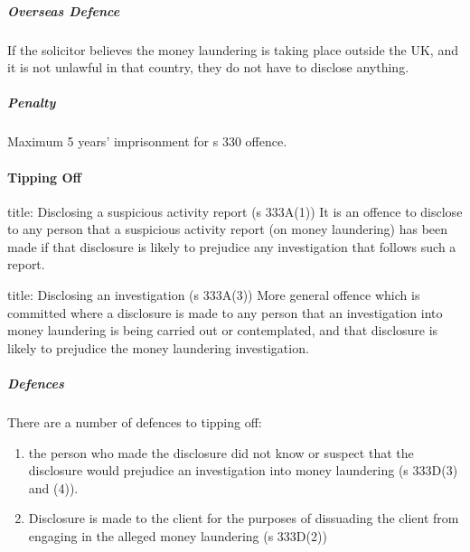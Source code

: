 \documentclass[
]{article}
\newenvironment{Shaded}{}{}
\newcommand{\NormalTok}[1]{#1}
\providecommand{\tightlist}{%
  \setlength{\itemsep}{0pt}\setlength{\parskip}{0pt}}
\begin{document}
\hypertarget{overseas-defence}{%
\subparagraph{Overseas Defence}\label{overseas-defence}}

If the solicitor believes the money laundering is taking place outside
the UK, and it is not unlawful in that country, they do not have to
disclose anything.

\hypertarget{penalty}{%
\subparagraph{Penalty}\label{penalty}}

Maximum 5 years' imprisonment for s 330 offence.

\hypertarget{tipping-off}{%
\paragraph{Tipping Off}\label{tipping-off}}

\begin{Shaded}
\begin{Highlighting}[]
\NormalTok{title: Disclosing a suspicious activity report (s 333A(1))}
\NormalTok{It is an offence to disclose to any person that a suspicious activity report (on money laundering) has been made if that disclosure is likely to prejudice any investigation that follows such a report. }
\end{Highlighting}
\end{Shaded}

\begin{Shaded}
\begin{Highlighting}[]
\NormalTok{title: Disclosing an investigation (s 333A(3))}
\NormalTok{More general offence which is committed where a disclosure is made to any person that an investigation into money laundering is being carried out or contemplated, and that disclosure is likely to prejudice the money laundering investigation.}
\end{Highlighting}
\end{Shaded}

\hypertarget{defences}{%
\subparagraph{Defences}\label{defences}}

There are a number of defences to tipping off:

\begin{enumerate}
\def\labelenumi{\arabic{enumi}.}
\tightlist
\item
  the person who made the disclosure did not know or suspect that the
  disclosure would prejudice an investigation into money laundering (s
  333D(3) and (4)).
\item
  Disclosure is made to the client for the purposes of dissuading the
  client from engaging in the alleged money laundering (s 333D(2))
\end{enumerate}
\end{document}
